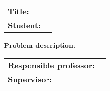 \begin{titlingpage}

\noindent
\begin{tabular}{@{}p{4cm}p{8cm}}
\textbf{Title:} 	& \thetitle \\
\textbf{Student:}	& \theauthor \\
\end{tabular}

\vspace{2ex}
\noindent\textbf{Problem description:}
\vspace{1ex}


\vspace{2ex}

\noindent
\begin{tabular}{@{}p{4cm}l}
\textbf{Responsible professor:} 	& \theprofessor \\
\textbf{Supervisor:}			& \thesupervisor \\
\end{tabular}

\end{titlingpage}